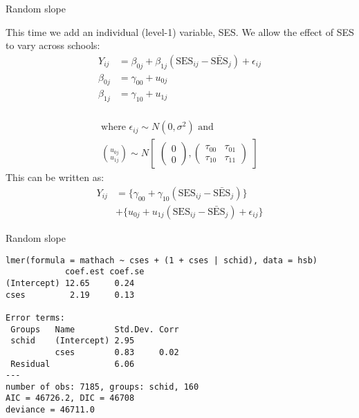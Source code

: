 \documentclass[10pt,ignorenonframetext,]{beamer}
\begin{document}
\begin{frame}{Random slope}

This time we add an individual (level-1) variable, SES. We allow the
effect of SES to vary across schools: \[
\begin{aligned}
Y_{ij} &= \beta_{0j} + \beta_{1j} (\mathrm{SES}_{ij}-\bar{\mathrm{SES}}_j) + \epsilon_{ij}\\
\beta_{0j} &= \gamma_{00} + u_{0j} \\
\beta_{1j} &= \gamma_{10} + u_{1j} \\
\end{aligned}
\]

\[
\begin{gathered}
\text{where } \epsilon_{ij} \sim N(0,\sigma^2) \text{ and } \\
  \binom{u_{0j}}{u_{1j}} \sim
   N \begin{bmatrix} \begin{pmatrix} 0\\0 \end{pmatrix},
      \begin{pmatrix} \tau_{00}&\tau_{01}\\\tau_{10}&\tau_{11} \end{pmatrix}
      \end{bmatrix}
\end{gathered}
\] This can be written as: \[
\begin{split}
Y_{ij} &= \{\gamma_{00} + \gamma_{10}(\mathrm{SES}_{ij}-\bar{\mathrm{SES}}_j)\}\\ 
  &+ \{ u_{0j} + u_{1j}(\mathrm{SES}_{ij}-\bar{\mathrm{SES}}_j) + \epsilon_{ij} \}
\end{split}
\]

\end{frame}

\begin{frame}[fragile]{Random slope}

\begin{verbatim}
lmer(formula = mathach ~ cses + (1 + cses | schid), data = hsb)
            coef.est coef.se
(Intercept) 12.65     0.24  
cses         2.19     0.13  

Error terms:
 Groups   Name        Std.Dev. Corr 
 schid    (Intercept) 2.95          
          cses        0.83     0.02 
 Residual             6.06          
---
number of obs: 7185, groups: schid, 160
AIC = 46726.2, DIC = 46708
deviance = 46711.0 
\end{verbatim}

\end{frame}
\end{document}

